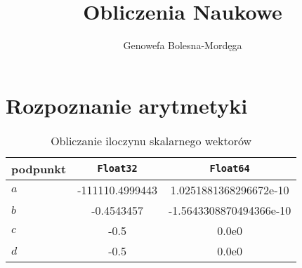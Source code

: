 \documentclass[11pt]{mk-polish-lab-report}
\author{Genowefa Bolesna-Mordęga}
\title{Obliczenia Naukowe}
\begin{document}
\maketitle

\section{Rozpoznanie arytmetyki}
\lipsum[1-2]

	\begin{table}[!h]
        \centering
        \footnotesize
		\begin{tabular}{lSS}
		\toprule
			{podpunkt} & {\texttt{Float32}} & {\texttt{Float64}} \\ \midrule
			$a$ & -111110.4999443 & 1.0251881368296672e-10 \\ 
 			$b$ & -0.4543457 & -1.5643308870494366e-10 \\
 			$c$ & -0.5 & 0.0e0 \\
 			$d$ & -0.5 & 0.0e0 \\\bottomrule
 		\end{tabular}
 		\caption{Obliczanie iloczynu skalarnego wektorów}
		\label{table:8}
	\end{table}	


\lipsum[3-5]
\end{document}
